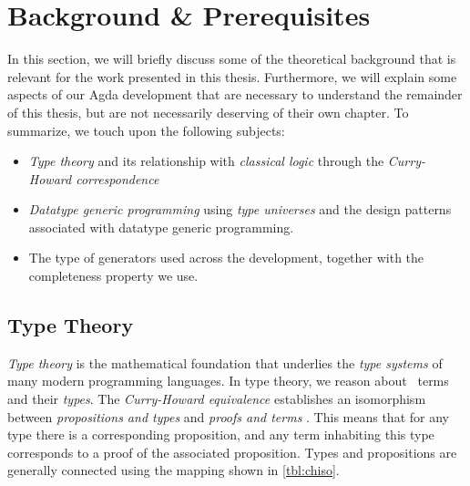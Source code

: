\documentclass[a4paper,msc,twosized=semi]{uustthesis}
\let\oldemph\emph
\renewcommand\emph[1]{{\large\oldemph{#1}}}
\begin{document}
\chapter{Background \& Prerequisites}
In this section, we will briefly discuss some of the theoretical background that is relevant for the work presented in this thesis. Furthermore, we will explain some aspects of our Agda development that are necessary to understand the remainder of this thesis, but are not necessarily deserving of their own chapter. To summarize, we touch upon the following subjects:

\begin{itemize}
  \item
    \emph{Type theory} and its relationship with \emph{classical logic} through the 
    \emph{Curry-Howard correspondence}

  \item 
    \emph{Datatype generic programming} using \emph{type universes} and the design 
    patterns associated with datatype generic programming.  

  \item 
    The type of generators used across the development, together with the completeness property we use. 

\end{itemize}

\section{Type Theory}

  \emph{Type theory} is the mathematical foundation that underlies the \emph{type 
  systems} of many modern programming languages. In type theory, we reason about \emph\
  {terms} and their \emph{types}. The \emph{Curry-Howard equivalence} establishes an isomorphism between \emph
  {propositions and types} and \emph{proofs and terms} \cite{wadler2015propositions}. 
  This means that for any type there is a corresponding proposition, and any term 
  inhabiting this type corresponds to a proof of the associated proposition. Types and 
  propositions are generally connected using the mapping shown in \cref{tbl:chiso}.
\end{document}
